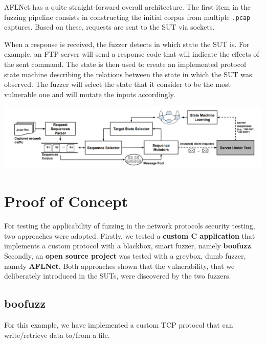 \documentclass[10pt,a4paper,english,onecolumn]{IEEEtran}
\begin{document}
AFLNet \cite{aflnet_repo} has a quite straight-forward overall architecture. The first item in the fuzzing pipeline consists in constructing the initial corpus from multiple \texttt{.pcap} captures. Based on these, requests are sent to the SUT via sockets.

When a response is received, the fuzzer detects in which state the SUT is. For example, an FTP server will send a response code that will indicate the effects of the sent command. The state is then used to create an implemented protocol state machine describing the relations between the state in which the SUT was observed. The fuzzer will select the state that it consider to be the most vulnerable one and will mutate the inputs accordingly.

\vspace{0.3cm}
\begin{center}
    \includegraphics[width=15cm]{images/aflnet.png}
    \label{fig:1}
    \captionsetup{justification=centering,margin=1cm}
\end{center}
\vspace{0.3cm}

\section{Proof of Concept}

For testing the applicability of fuzzing in the network protocols security testing, two approaches were adopted. Firstly, we tested a \textbf{custom C application} that implements a custom protocol with a blackbox, smart fuzzer, namely \textbf{boofuzz}. Secondly, an \textbf{open source project} was tested with a greybox, dumb fuzzer, namely \textbf{AFLNet}. Both approaches shown that the vulnerability, that we deliberately introduced in the SUTs, were discovered by the two fuzzers.

\subsection{boofuzz}

For this example, we have implemented a custom TCP protocol that can write/retrieve data to/from a file.
\end{document}
